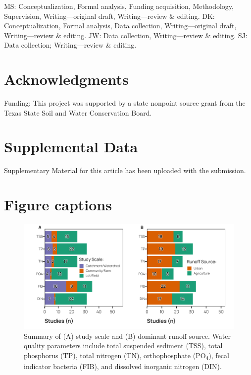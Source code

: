 \documentclass[utf8]{FrontiersinHarvard}
\begin{document}
MS: Conceptualization, Formal analysis, Funding acquisition, Methodology, Supervision, Writing---original draft, Writing---review \& editing.
DK: Conceptualization, Formal analysis, Data collection, Writing---original draft, Writing---review \& editing.
JW: Data collection, Writing---review \& editing.
SJ: Data collection; Writing---review \& editing.

\hypertarget{acknowledgments}{%
\section*{Acknowledgments}\label{acknowledgments}}

Funding: This project was supported by a state nonpoint source grant from the Texas State Soil and Water Conservation Board.

\hypertarget{supplemental-data}{%
\section*{Supplemental Data}\label{supplemental-data}}

Supplementary Material for this article has been uploaded with the submission.




\hypertarget{figure-captions}{%
\section*{Figure captions}\label{figure-captions}}

\begin{figure}
\includegraphics[width=1\linewidth,]{../figures/bmp_summary} \caption{Summary of (A) study scale and (B) dominant runoff source. Water quality parameters include total suspended sediment (TSS), total phosphorus (TP), total nitrogen (TN), orthophosphate (PO\textsubscript{4}), fecal indicator bacteria (FIB), and dissolved inorganic nitrogen (DIN).}\label{fig:bmpsummary}
\end{figure}
\end{document}
